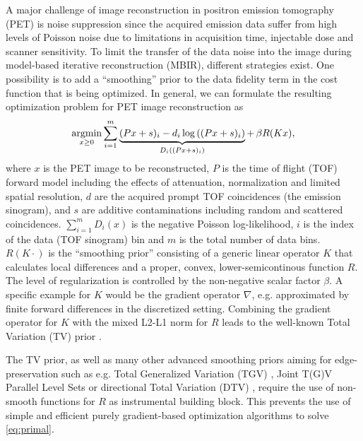 A major challenge of image reconstruction in positron emission tomography (PET)
is noise suppression since the acquired emission data suffer from high levels of Poisson
noise due to limitations in acquisition time, injectable dose and scanner sensitivity.
To limit the transfer of the data noise into the image during model-based iterative
reconstruction (MBIR), different strategies exist. 
One possibility is to add a ``smoothing'' prior to the data fidelity term in the cost
function that is being optimized.
In general, we can formulate the resulting optimization problem for PET image reconstruction as
%
\begin{equation}
\operatorname*{argmin} _{x\geq 0} \sum_{i=1}^{m} \underbrace{(Px + s)_i -  d_i \log \left( (Px + s)_i \right)}_{D_i((Px+s)_i)} + \, \beta R(Kx),
\label{eq:primal}
\end{equation}
%
where $x$ is the PET image to be reconstructed, $P$ is the time of flight (TOF) 
forward model including the effects
of attenuation, normalization and limited spatial resolution, $d$ are the 
acquired prompt TOF coincidences (the emission sinogram), 
and $s$ are additive contaminations including random and scattered coincidences. 
$\sum_{i=1}^m D_i(x)$ is the negative Poisson log-likelihood, $i$ is the index of the data (TOF sinogram)
bin and $m$ is the total number of data bins.
$R(K\cdot)$ is the ``smoothing prior'' consisting of a generic linear operator $K$ that calculates 
local differences and a proper, convex, lower-semicontinous function $R$.
The level of regularization is controlled by the non-negative scalar factor $\beta$.
A specific example for $K$ would be the gradient operator $\nabla$, e.g. approximated by finite forward 
differences in the discretized setting.
Combining the gradient operator for $K$ with the mixed L2-L1 norm for $R$ leads to the well-known 
Total Variation (TV) prior \cite{Rudin1992}.

The TV prior, as well as many other advanced smoothing priors aiming for edge-preservation 
such as e.g. Total Generalized Variation (TGV) 
\cite{Bredies2010}, Joint T(G)V \cite{Rigie2015,Knoll2016}
Parallel Level Sets \cite{Ehrhardt2016a,Schramm2017} or directional Total Variation (DTV)
\cite{Ehrhardt2016}, require the use of non-smooth functions for $R$ as instrumental building block.
This prevents the use of simple and efficient 
purely gradient-based optimization algorithms to solve \eqref{eq:primal}.



